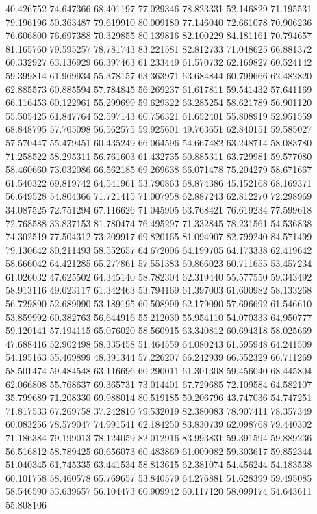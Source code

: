 40.426752
74.647366
68.401197
77.029346
78.823331
52.146829
71.195531
79.196196
50.363487
79.619910
80.009180
77.146040
72.661078
70.906236
76.606800
76.697388
70.329855
80.139816
82.100229
84.181161
70.794657
81.165760
79.595257
78.781743
83.221581
82.812733
71.048625
66.881372
60.332927
63.136929
66.397463
61.233449
61.570732
62.169827
60.524142
59.399814
61.969934
55.378157
63.363971
63.684844
60.799666
62.482820
62.885573
60.885594
57.784845
56.269237
61.617811
59.541432
57.641169
66.116453
60.122961
55.299699
59.629322
63.285254
58.621789
56.901120
55.505425
61.847764
52.597143
60.756321
61.652401
55.808919
52.951559
68.848795
57.705098
56.562575
59.925601
49.763651
62.840151
59.585027
57.570447
55.479451
60.435249
66.064596
54.667482
63.248714
58.083780
71.258522
58.295311
56.761603
61.432735
60.885311
63.729981
59.577080
58.460660
73.032086
66.562185
69.269638
66.071478
75.204279
58.671667
61.540322
69.819742
64.541961
53.790863
68.874386
45.152168
68.169371
56.649528
54.804366
71.721415
71.007958
62.887243
62.812270
72.298969
34.087525
72.751294
67.116626
71.045905
63.768421
76.619234
77.599618
72.768588
33.837153
81.780474
76.495297
71.332845
78.231561
54.536838
74.302519
77.504312
73.209917
69.820165
81.094907
82.799240
84.571499
79.130642
80.211493
58.552657
64.672006
64.199705
64.173338
62.419642
58.666042
64.421285
65.277861
57.551383
60.866023
60.711655
53.457234
61.026032
47.625502
64.345140
58.782304
62.319440
55.577550
59.343492
58.913116
49.023117
61.342463
53.794169
61.397003
61.600982
58.133268
56.729890
52.689990
53.189195
60.508999
62.179090
57.696692
61.546610
53.859992
60.382763
56.644916
55.212030
55.954110
54.070333
64.950777
59.120141
57.194115
65.076020
58.560915
63.340812
60.694318
58.025669
47.688416
52.902498
58.335458
51.464559
64.080243
61.595948
64.241509
54.195163
55.409899
48.391344
57.226207
66.242939
66.552329
66.711269
58.501474
59.484548
63.116696
60.290011
61.301308
59.456040
68.445804
62.066808
55.768637
69.365731
73.014401
67.729685
72.109584
64.582107
35.799689
71.208330
69.988014
80.519185
50.206796
43.747036
54.747251
71.817533
67.269758
37.242810
79.532019
82.380083
78.907411
78.357349
60.083256
78.579047
74.991541
62.184250
83.830739
62.098768
79.440302
71.186384
79.199013
78.124059
82.012916
83.993831
59.391594
59.889236
56.516812
58.789425
60.656073
60.483869
61.009082
59.303617
59.852344
51.040345
61.745335
63.441534
58.813615
62.381074
54.456244
54.183538
60.101758
58.460578
65.769657
53.840579
64.276881
51.628399
59.495085
58.546590
53.639657
56.104473
60.909942
60.117120
58.099174
54.643611
55.808106
